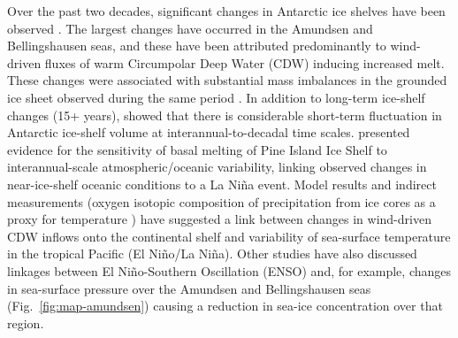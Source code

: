Over the past two decades, significant changes in Antarctic ice shelves have been observed \parencite{Cook2010, Shepherd2010, Scambos2004, Scambos2009, Rignot2004, Rignot2014, Pritchard2012, Paolo2015}. The largest changes have occurred in the Amundsen and Bellingshausen seas, and these have been attributed predominantly to wind-driven fluxes of warm Circumpolar Deep Water (CDW) inducing increased melt. These changes were associated with substantial mass imbalances in the grounded ice sheet observed during the same period \parencite{Shepherd2012, Chen2009, Velicogna2009, Harig2015}. In addition to long-term ice-shelf changes (15+ years), \textcite{Paolo2015, Paolo2015a} showed that there is considerable short-term fluctuation in Antarctic ice-shelf volume at interannual-to-decadal time scales. \textcite{Dutrieux2014} presented evidence for the sensitivity of basal melting of Pine Island Ice Shelf to interannual-scale atmospheric/oceanic variability, linking observed changes in near-ice-shelf oceanic conditions to a La Ni\~na event. Model results \parencite{Steig2012} and indirect measurements (oxygen isotopic composition of precipitation from ice cores as a proxy for temperature \parencite{Steig2013}) have suggested a link between changes in wind-driven CDW inflows onto the continental shelf and variability of sea-surface temperature in the tropical Pacific (El Ni\~no/La Ni\~na). Other studies \parencite[e.g., ][]{Yuan2004, Turner2004} have also discussed linkages between El Ni\~{n}o-Southern Oscillation (ENSO) and, for example, changes in sea-surface pressure over the Amundsen and Bellingshausen seas (Fig.~\ref{fig:map-amundsen}) causing a reduction in sea-ice concentration over that region.


